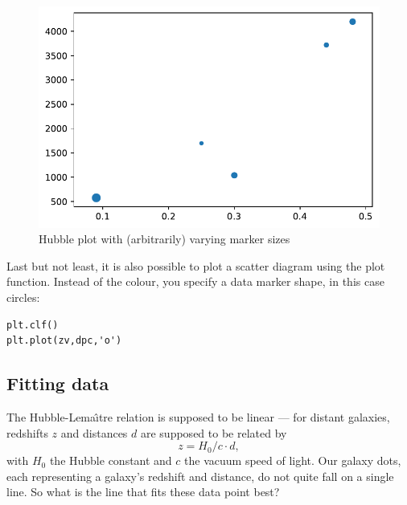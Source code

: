 \documentclass[twocolumn,apj]{openjournal}
\newcommand{\be}{\begin{equation}}
\newcommand{\ee}{\end{equation}}
\begin{document}
\begin{figure}[htbp]
\begin{center}
\includegraphics[width=\linewidth]{variable-sizes-scatter.pdf}
\caption{Hubble plot with (arbitrarily) varying marker sizes}
\label{VaryingSizesExample}
\end{center}
\end{figure}


Last but not least, it is also possible to plot a scatter diagram using the plot function. Instead of the colour, you specify a data marker shape, in this case circles:
\begin{lstlisting}
plt.clf()
plt.plot(zv,dpc,'o')
\end{lstlisting}

\subsection{Fitting data}

The Hubble-Lema\^{\i}tre relation is supposed to be linear --- for distant galaxies, redshifts $z$ and distances $d$ are supposed to be related by 
\be
z = H_0/c\cdot d,
\ee
with $H_0$ the Hubble constant and $c$ the vacuum speed of light. Our galaxy dots, each representing a galaxy's redshift and distance, do not quite fall on a single line. So what is the line that fits these data point best?
\end{document}
